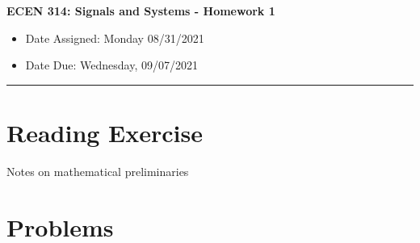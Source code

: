 \documentclass[11pt]{article}
\begin{document}

\vspace*{-1in}
\begin{center}
\Large
{{\bf ECEN 314: Signals and Systems - Homework 1}}
\end{center}
\begin{itemize}
\item Date Assigned:  Monday 08/31/2021
\item Date Due: Wednesday, 09/07/2021
\end{itemize}
\hrule

\section{Reading Exercise}
Notes on mathematical preliminaries
\section{Problems}
\end{document}
